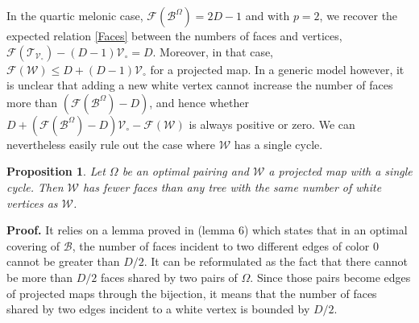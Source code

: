 \documentclass[aps,prd,10pt,notitlepage,nofootinbib,superscriptaddress,showkeys,showpacs]{revtex4-1}
\newtheorem{prop}{Proposition}
\begin{document}
In the quartic melonic case, ${\mathcal{F}}({\mathcal{B}}^\Omega) = 2D-1$ and with $p=2$, we recover the expected relation \eqref{Faces} between the numbers of faces and vertices, ${\mathcal{F}}({\mathcal{T}}_{{\mathcal{V}}_\circ}) -(D-1){\mathcal{V}}_\circ = D$. Moreover, in that case, ${\mathcal{F}}({\mathcal{W}}) \leq D+ (D-1){\mathcal{V}}_\circ$ for a projected map. In a generic model however, it is unclear that adding a new white vertex cannot increase the number of faces more than $({\mathcal{F}}({\mathcal{B}}^\Omega) - D)$, and hence whether $D + ({\mathcal{F}}({\mathcal{B}}^\Omega)-D){\mathcal{V}}_\circ - {\mathcal{F}}({\mathcal{W}})$ is always positive or zero. We can nevertheless easily rule out the case where ${\mathcal{W}}$ has a single cycle.

\begin{prop}
Let $\Omega$ be an optimal pairing and ${\mathcal{W}}$ a projected map with a single cycle. Then ${\mathcal{W}}$ has fewer faces than any tree with the same number of white vertices as ${\mathcal{W}}$.
\end{prop}

{\bf Proof.} It relies on a lemma proved in \cite{Universality} (lemma 6) which states that in an optimal covering of ${\mathcal{B}}$, the number of faces incident to two different edges of color 0 cannot be greater than $D/2$. It can be reformulated as the fact that there cannot be more than $D/2$ faces shared by two pairs of $\Omega$. Since those pairs become edges of projected maps through the bijection, it means that the number of faces shared by two edges incident to a white vertex is bounded by $D/2$. 
\end{document}
